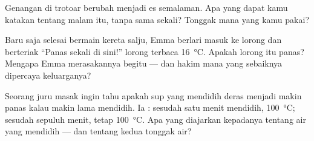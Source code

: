 \begin{exercise}[$\star$]\label{exo:g3:temperature-thermometers:9}
Genangan di trotoar berubah menjadi es semalaman. Apa yang dapat kamu
katakan tentang  malam itu, tanpa  sama sekali? Tonggak
mana yang kamu pakai?
\end{exercise}

\begin{exercise}[$\star\star$]\label{exo:g3:temperature-thermometers:10}
Baru saja selesai bermain kereta salju, Emma berlari masuk ke lorong
dan berteriak ``Panas sekali di sini!''  lorong terbaca
\qty{16}{\celsius}. Apakah lorong itu panas? Mengapa Emma merasakannya
begitu --- dan hakim mana yang sebaiknya dipercaya keluarganya?
\end{exercise}

\begin{exercise}[$\star\star$]\label{exo:g3:temperature-thermometers:11}
Seorang juru masak ingin tahu apakah sup yang mendidih deras menjadi
makin panas kalau makin lama mendidih. Ia : sesudah satu menit
mendidih, \qty{100}{\celsius}; sesudah sepuluh menit, tetap
\qty{100}{\celsius}. Apa yang diajarkan  kepadanya tentang
air yang mendidih --- dan tentang kedua tonggak air?
\end{exercise}
